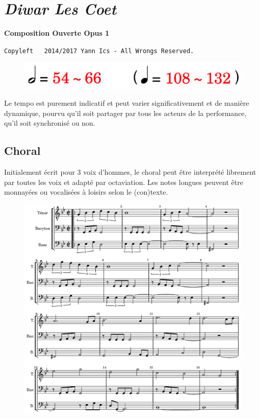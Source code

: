 \newpage
{}
{}
\thispagestyle{empty}

\section*{\textsl{Diwar Les Coet}}
\label{dlcscore}

\begin{center} 
\textbf{Composition Ouverte Opus 1}

{\scriptsize  \texttt{Copyleft \textcopyleft \, 2014/2017 Yann Ics - All Wrongs Reserved.}}
 \end{center} 
 \begin{figure}[H]
\includegraphics[scale=0.1]{img/dlct}
\end{figure}
 
 Le tempo est purement indicatif et peut varier significativement et de manière dynamique, pourvu qu'il soit partager par tous les acteurs de la performance, qu'il soit synchronisé ou non.

\subsection*{Choral}

Initialement écrit pour 3 voix d'hommes, le choral peut être interprété librement par toutes les voix et adapté par octaviation. Les notes longues peuvent être monnayées ou vocalisées à loisirs selon le (con)texte. 

 \begin{figure}[H]
\begin{center}
\includegraphics[scale=0.68]{img/dlc1}
\end{center}
\end{figure}

